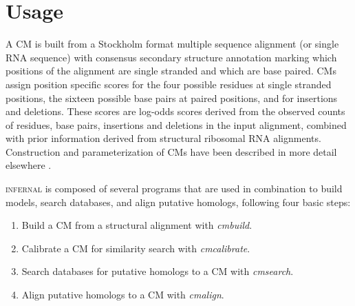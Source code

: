 
\section{Usage} 

A CM is built from a Stockholm format \citep{infguide03} multiple
sequence alignment (or single RNA sequence) with consensus secondary
structure annotation marking which positions of the alignment are
single stranded and which are base paired. CMs assign position
specific scores for the four possible residues at single stranded
positions, the sixteen possible base pairs at paired positions, and
for
insertions and deletions. These scores are log-odds scores derived
from the observed counts of residues, base pairs, insertions and
deletions in the input alignment, combined with prior information
derived from structural ribosomal RNA alignments. Construction and
parameterization of CMs have been described in more detail elsewhere
\citep{Eddy94,infguide03,Eddy02b,NawrockiEddy07}.

\textsc{infernal} is composed of several programs that are used in
combination to build models, search databases, and align putative
homologs, following four basic steps:

\begin{enumerate}
\item Build a CM from a structural alignment with \emph{cmbuild}.

\begin{comment}
\emph{cmbuild} takes as input a structural multiple
RNA alignment in Stockholm format \citep{infguide03} and creates a CM
file that is used by other \textsc{infernal} programs.
\end{comment}
\begin{comment}
\emph{cmbuild} creates a CM file for use with other \textsc{infernal}
programs from an input structural multiple alignment in Stockholm
format \cite{infguide03}.
\end{comment}
\item Calibrate a CM for similarity search with \emph{cmcalibrate}.

\item Search databases for putative homologs to a CM with \emph{cmsearch}.

\begin{comment}
Given a CM file and a target database as input, 
\emph{cmsearch} searches the target database
for high scoring hits to the model and outputs alignments
of each hit in a BLAST-like format augmented with structure
annotation.
\end{comment}

\item Align putative homologs to a CM with \emph{cmalign}.

\begin{comment}
\emph{cmalign} takes a CM file and a file of putative homologs, and
aligns the full length sequences to the model, creating a 
structurally annotated multiple alignment in Stockholm format.
\end{comment}

\end{enumerate}

